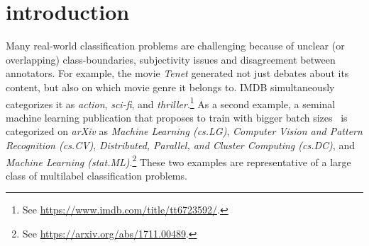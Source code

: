 
\section{introduction}
\label{sec:org662677c}


Many real-world classification problems are challenging because of unclear (or overlapping) class-boundaries, subjectivity issues and disagreement between annotators.
For example, the movie \textit{Tenet} generated not just debates about its content, but also on which movie genre it belongs to. IMDB simultaneously categorizes it as \textit{action}, \textit{sci-fi}, and \textit{thriller}.\footnote{See \url{https://www.imdb.com/title/tt6723592/}.}
As a second example, a seminal machine learning publication that proposes to train with bigger batch sizes~\citep{bigBSArxiv} is categorized on \textit{arXiv} as \textit{Machine Learning (cs.LG)},
\textit{Computer Vision and Pattern Recognition (cs.CV)}, \textit{Distributed,
Parallel, and Cluster Computing (cs.DC)}, and \textit{Machine Learning
(stat.ML)}.\footnote{See \url{https://arxiv.org/abs/1711.00489}.}
These two examples are representative of a large class of multilabel classification problems.


\begin{comment}
\begin{enumerate}[label=(\arabic*),leftmargin=*]
\item The possibility of assigning more than one label to a single instance is desirable (i.e., labels are not mutually exclusive).
\item The instance being labeled needs to be inspected or consumed in its entirety before a full set of class labels can be determined. For example, it requires an entire viewing of the movie \textit{Tenet} to determine if the label \textit{romance} is appropriate, as it is arguably the underlying driver of the protagonists.
\item The number of labels differs per instance, making the number of labels to assign at inference time unknown.
\end{enumerate}
\end{comment}

